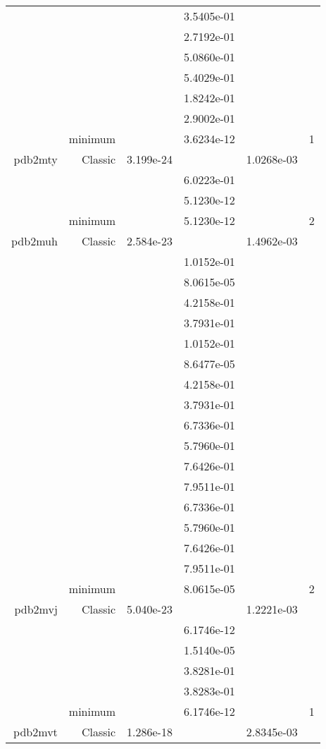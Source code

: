 \begin{xltabular}{\textwidth}{r|rS[table-format=1.3e+2]S[table-format=1.4e+2]S[table-format=1.4e+2]S[table-format=-1.5]}
&  &  & 3.5405e-01 & & \\
&  &  & 2.7192e-01 & & \\
&  &  & 5.0860e-01 & & \\
&  &  & 5.4029e-01 & & \\
&  &  & 1.8242e-01 & & \\
&  &  & 2.9002e-01 & & \\
& minimum &  & 3.6234e-12 & & 1 \\  \addlinespace
pdb2mty & Classic & 3.199e-24 &  & 1.0268e-03 & \\
&  &  & 6.0223e-01 & & \\
&  &  & 5.1230e-12 & & \\
& minimum &  & 5.1230e-12 & & 2 \\  \addlinespace
pdb2muh & Classic & 2.584e-23 &  & 1.4962e-03 & \\
&  &  & 1.0152e-01 & & \\
&  &  & 8.0615e-05 & & \\
&  &  & 4.2158e-01 & & \\
&  &  & 3.7931e-01 & & \\
&  &  & 1.0152e-01 & & \\
&  &  & 8.6477e-05 & & \\
&  &  & 4.2158e-01 & & \\
&  &  & 3.7931e-01 & & \\
&  &  & 6.7336e-01 & & \\
&  &  & 5.7960e-01 & & \\
&  &  & 7.6426e-01 & & \\
&  &  & 7.9511e-01 & & \\
&  &  & 6.7336e-01 & & \\
&  &  & 5.7960e-01 & & \\
&  &  & 7.6426e-01 & & \\
&  &  & 7.9511e-01 & & \\
& minimum &  & 8.0615e-05 & & 2 \\  \addlinespace
pdb2mvj & Classic & 5.040e-23 &  & 1.2221e-03 & \\
&  &  & 6.1746e-12 & & \\
&  &  & 1.5140e-05 & & \\
&  &  & 3.8281e-01 & & \\
&  &  & 3.8283e-01 & & \\
& minimum &  & 6.1746e-12 & & 1 \\  \addlinespace
pdb2mvt & Classic & 1.286e-18 &  & 2.8345e-03 & \\

\end{xltabular}
